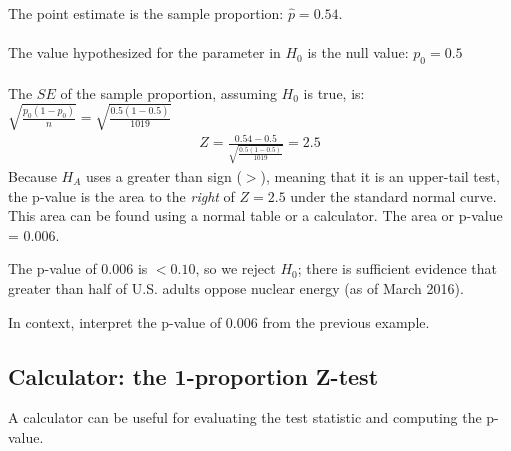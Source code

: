 \begin{examplewrap}
\begin{nexample}
\begin{description}
The point estimate is the sample proportion: $\hat{p} = 0.54.$\\
\\
The value hypothesized for the parameter in $H_0$ is the null value: $p_0 = 0.5$\\
\\
The $SE$ of the sample proportion, assuming $H_0$ is true, is: $\sqrt{\frac{p_0(1-p_0)}{n}}= \sqrt{\frac{0.5(1-0.5)}{1019}}$ \\
\begin{align*}
Z = \frac{0.54 - 0.5}{\sqrt{\frac{0.5(1-0.5)}{1019}}} = 2.5
\end{align*}
Because $H_A$ uses a greater than sign ($>$), meaning that it is an upper-tail test, the \mbox{p-value} is the area to the \emph{right} of $Z=2.5$ under the standard normal curve.  This area can be found using a normal table or a calculator.  The area or p-value = $0.006$.  
\item[\inferencestep{Conclude}]  The p-value of 0.006 is $< 0.10$, so we reject $H_0$; there is sufficient evidence that greater than half of U.S. adults oppose nuclear energy (as of March 2016).  
\end{description}
\end{nexample}
\end{examplewrap}



\begin{exercisewrap}
\begin{nexercise}
In context, interpret the p-value of 0.006 from the previous example.\footnotemark
\end{nexercise}
\end{exercisewrap}


\D{\newpage}

\subsection{Calculator:  the 1-proportion Z-test}
A calculator can be useful for evaluating the test statistic and computing the p-value.  
\label{1propZtest}

